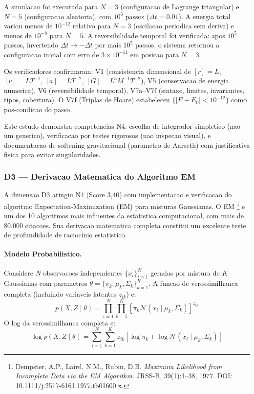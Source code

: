 A simulacao foi executada para $N=3$ (configuracao de Lagrange triangular)
e $N=5$ (configuracao aleatoria), com $10^6$ passos ($\Delta t = 0.01$).
A energia total variou menos de $10^{-12}$ relativo para $N=3$ (oscilacao
periodica sem deriva) e menos de $10^{-8}$ para $N=5$. A reversibilidade
temporal foi verificada: apos $10^5$ passos, invertendo $\Delta t \to
-\Delta t$ por mais $10^5$ passos, o sistema retornou a configuracao
inicial com erro de $3 \times 10^{-11}$ em posicao para $N=3$.

Os verificadores confirmaram: V1 (consistencia dimensional de $[r]=L$,
$[v]=LT^{-1}$, $[a]=LT^{-2}$, $[G]=L^3 M^{-1} T^{-2}$), V5 (conservacao
de energia numerica), V6 (reversibilidade temporal), V7a--V7f (sintaxe,
limites, invariantes, tipos, cobertura). O V7f (Triplas de Hoare)
estabeleceu $\{|E - E_0| < 10^{-12}\}$ como pos-condicao do passo.

Este estudo demonstra competencias N4: escolha de integrador simpletico
(nao um generico), verificacao por testes rigorosos (nao inspecao visual),
e documentacao de softening gravitacional (parametro de Aarseth) com
justificativa fisica para evitar singularidades.

\subsubsection{D3 --- Derivacao Matematica do Algoritmo EM}

A dimensao D3 atingiu N4 (Score 3,40) com implementacao e verificacao do
algoritmo Expectation-Maximization (EM) para misturas Gaussianas. O EM
\footnote{Dempster, A.P., Laird, N.M., Rubin, D.B. \textit{Maximum
Likelihood from Incomplete Data via the EM Algorithm}. JRSS-B,
39(1):1--38, 1977. DOI: 10.1111/j.2517-6161.1977.tb01600.x.} e um dos
10 algoritmos mais influentes da estatistica computacional, com mais de
80.000 citacoes. Sua derivacao matematica completa constitui um excelente
teste de profundidade de raciocinio estatistico.

\paragraph{Modelo Probabilistico.}

Considere $N$ observacoes independentes $\{x_i\}_{i=1}^{N}$ geradas por
mistura de $K$ Gaussianas com parametros $\theta = \{\pi_k, \mu_k,
\Sigma_k\}_{k=1}^{K}$. A funcao de verossimilhanca completa (incluindo
variaveis latentes $z_{ik}$) e:
\[
p(X, Z \mid \theta) = \prod_{i=1}^{N} \prod_{k=1}^{K}
[\pi_k \mathcal{N}(x_i \mid \mu_k, \Sigma_k)]^{z_{ik}}
\]
O log da verossimilhanca completa e:
\[
\log p(X, Z \mid \theta) = \sum_{i=1}^{N} \sum_{k=1}^{K} z_{ik}
[\log \pi_k + \log \mathcal{N}(x_i \mid \mu_k, \Sigma_k)]
\]

